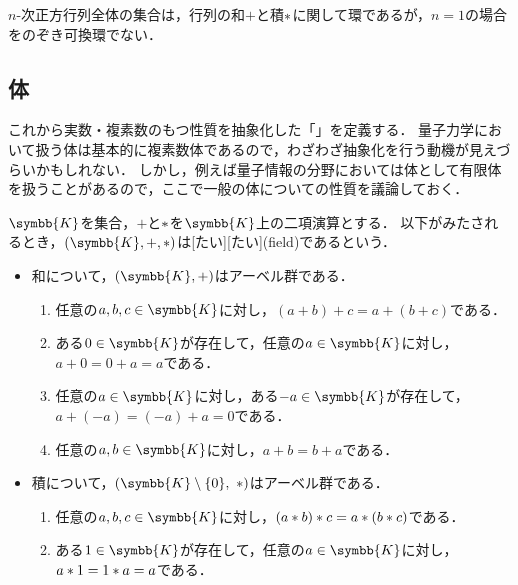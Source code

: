 \documentclass[../sotsu.tex]{subfiles}
\begin{document}
\begin{example}
    $n$-次正方行列全体の集合は，行列の和$+$と積$\mathbin{\ast}$に関して環であるが，$n = 1$の場合をのぞき可換環でない．
\end{example}



\subsection{体}

これから実数・複素数のもつ性質を抽象化した「」を定義する．
量子力学において扱う体は基本的に複素数体であるので，わざわざ抽象化を行う動機が見えづらいかもしれない．
しかし，例えば量子情報の分野においては体として有限体を扱うことがあるので，ここで一般の体についての性質を議論しておく．

\begin{definition}[体]
    \label{dfn:field}
    $\symbb{K}$を集合，$+$と$\mathbin{\ast}$を$\symbb{K}$上の二項演算とする．
    以下がみたされるとき，$(\symbb{K}, +, \dotprod)$は[たい][たい](field)であるという．
    \begin{itemize}
        \item 和について，$(\symbb{K}, +)$はアーベル群である．
        \begin{enumerate}
            \item \label{field:sum-associative} 任意の$a, b, c \in \symbb{K}$に対し，$(a + b) + c = a + (b + c)$である．
            \item \label{field:sum-zero} ある$0 \in \symbb{K}$が存在して，任意の$a \in \symbb{K}$に対し，$a + 0 = 0 + a = a$である．
            \item \label{field:sum-opposite} 任意の$a \in \symbb{K}$に対し，ある$-a \in \symbb{K}$が存在して，$a + (-a) = (-a) + a = 0$である．
            \item \label{field:sum-commutative} 任意の$a, b \in \symbb{K}$に対し，$a + b = b + a$である．
        \end{enumerate}
        \item 積について，$(\symbb{K} \setminus \{ 0 \}, \  \dotprod)$はアーベル群である．
        \begin{enumerate}[resume]
            \item \label{field:prod-associative} 任意の$a, b, c \in \symbb{K}$に対し，$(a \mathbin{\ast} b) \mathbin{\ast} c = a \mathbin{\ast} (b \mathbin{\ast} c)$である．
            \item \label{field:prod-one} ある$1 \in \symbb{K}$が存在して，任意の$a \in \symbb{K}$に対し，$a \mathbin{\ast} 1 = 1 \mathbin{\ast} a = a$である．

\end{enumerate}
\end{itemize}
\end{definition}
\end{document}
